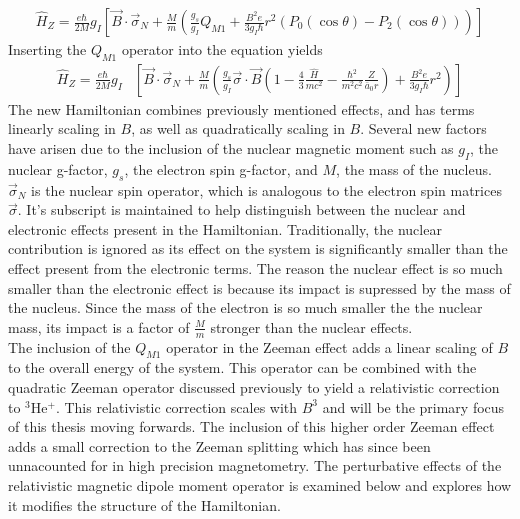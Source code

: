             \begin{align}
                \hat{H}_Z = \frac{e\hbar}{2M} g_I  \left[ \vec{B} \cdot \vec{\sigma}_N + \frac{M}{m} \left(\frac{g_s}{g_I} Q_{M1} + \frac{B^2 e}{3g_I \hbar} r^2 \left( P_0(\cos \theta) - P_2(\cos\theta) \right) \right) \right]
            \end{align}
            \noindent Inserting the $Q_{M1}$ operator into the equation yields 
            \small         
            \begin{align}
                \hat{H}_Z = \frac{e\hbar}{2M} g_I  &\left[ \vec{B} \cdot \vec{\sigma}_N + \frac{M}{m} \left(\frac{g_s}{g_I} \vec{\sigma} \cdot \vec{B} \left(1 - \frac{4}{3}\frac{\hat{H}}{mc^2} - \frac{\hbar^2}{m^2 c^2}\frac{Z}{\bar{a}_0 r} \right) + \frac{B^2 e}{3g_I \hbar} r^2 \right) \right]
            \end{align}
            \normalsize
            \noindent The new Hamiltonian combines previously mentioned effects, and has terms linearly scaling in $B$, as well as quadratically scaling in $B$. Several new factors have arisen due to the inclusion of the nuclear magnetic moment such as $g_I$, the nuclear g-factor, $g_s$, the electron spin g-factor, and $M$, the mass of the nucleus. $\vec{\sigma}_N$ is the nuclear spin operator, which is analogous to the electron spin matrices $\vec{\sigma}$. It's subscript is maintained to help distinguish between the nuclear and electronic effects present in the Hamiltonian. Traditionally, the nuclear contribution is ignored as its effect on the system is significantly smaller than the effect present from the electronic terms. The reason the nuclear effect is so much smaller than the electronic effect is because its impact is supressed by the mass of the nucleus. Since the mass of the electron is so much smaller the the nuclear mass, its impact is a factor of $\frac{M}{m}$ stronger than the nuclear effects.\\

            The inclusion of the $Q_{M1}$ operator in the Zeeman effect adds a linear scaling of $B$ to the overall energy of the system. This operator can be combined with the quadratic Zeeman operator discussed previously to yield a relativistic correction to $^3$He$^+$. This relativistic correction scales with $B^3$ and will be the primary focus of this thesis moving forwards. The inclusion of this higher order Zeeman effect adds a small correction to the Zeeman splitting which has since been unnacounted for in high precision magnetometry. The perturbative effects of the relativistic magnetic dipole moment operator is examined below and explores how it modifies the structure of the Hamiltonian. \\
            
